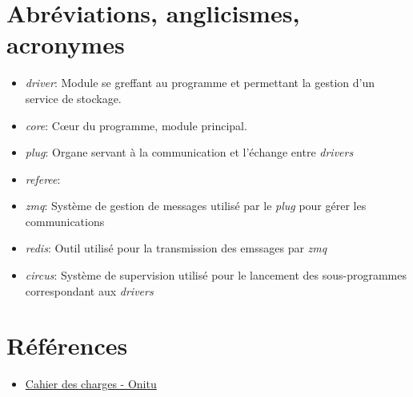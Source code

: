 \section{Abréviations, anglicismes, acronymes}

\begin{itemize}
\itemsep1pt\parskip0pt
\item
  \emph{driver}: Module se greffant au programme et permettant la gestion d'un service de stockage.
\item
  \emph{core}: Cœur du programme, module principal.
\item
  \emph{plug}: Organe servant à la communication et l'échange entre \emph{drivers}
\item
  \emph{referee}:
\item
  \emph{zmq}: Système de gestion de messages utilisé par le \emph{plug} pour gérer les communications
\item
  \emph{redis}: Outil utilisé pour la transmission des emssages par \emph{zmq}
\item
  \emph{circus}: Système de supervision utilisé pour le lancement des sous-programmes correspondant aux \emph{drivers}
\end{itemize}

\section{Références}
\begin{itemize}
\itemsep1pt\parskip0pt
\item
  \href{https://labeip.epitech.eu/svn/2015/onitu/rendu/2015_CDC2_FR_onitu.pdf}{Cahier des charges - Onitu}
\end{itemize}
